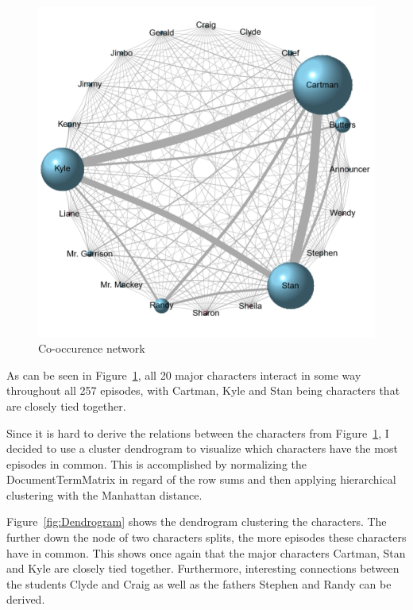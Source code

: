 \documentclass[10pt,a4paper]{article}
\begin{document}
	
	\begin{figure}[h]
	\centering
	\includegraphics[scale=0.6]{images/CoOccurenceMatrix.png}
	\caption{Co-occurence network}
	\label{fig:CoOccurence}
	\end{figure}		
	
	
	As can be seen in Figure~\ref{fig:CoOccurence}, all 20 major characters interact in some way throughout all 257 episodes, with Cartman, Kyle and Stan being characters that are closely tied together. 
	
	Since it is hard to derive the relations between the characters from Figure~\ref{fig:CoOccurence}, I decided to use a cluster dendrogram to visualize which characters have the most episodes in common. This is accomplished by normalizing the DocumentTermMatrix in regard of the row sums and then applying hierarchical clustering with the Manhattan distance.
	
	Figure~\ref{fig:Dendrogram} shows the dendrogram clustering the characters. The further down the node of two characters splits, the more episodes these characters have in common. This shows once again that the major characters Cartman, Stan and Kyle are closely tied together. Furthermore, interesting connections between the students Clyde and Craig as well as the fathers Stephen and Randy can be derived.
	
\end{document}
